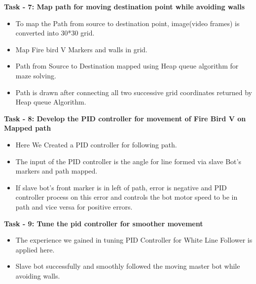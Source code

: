 \documentclass[report]{res}
\begin{document}
	{\Large \textbf{Task - 7: Map path for moving destination point while avoiding walls}} \\
	
	\begin{itemize}
		
		\item To map the Path from source to destination point, image(video frames) is converted into 30*30 grid. 
		\item Map Fire bird V Markers and walls in grid. 
		\item Path from Source to Destination mapped using Heap queue algorithm for maze solving.
		\item Path is drawn after connecting all two successive grid coordinates returned by Heap queue Algorithm.\\
		
	\end{itemize}
	
	{\Large \textbf{Task - 8: Develop the PID controller for movement of Fire Bird V on Mapped path}} \\
	
	\begin{itemize}
		
		\item Here We Created a PID controller for following path. 
		\item The input of the PID controller is the angle for line formed via slave Bot's markers and path mapped. 
		\item If slave bot's front marker is in left of path, error is negative and PID controller process on this error and controls the bot motor speed to be in path and vice versa for positive errors.\\
		
	\end{itemize}
	
	{\Large \textbf{Task - 9: Tune the pid controller for smoother movement}} \\
	
	\begin{itemize}
		
		\item The experience we gained in tuning PID Controller for White Line Follower is applied here. 
		\item Slave bot successfully and smoothly followed the moving master bot while avoiding walls.\\
		
	\end{itemize}
	
\end{document}
